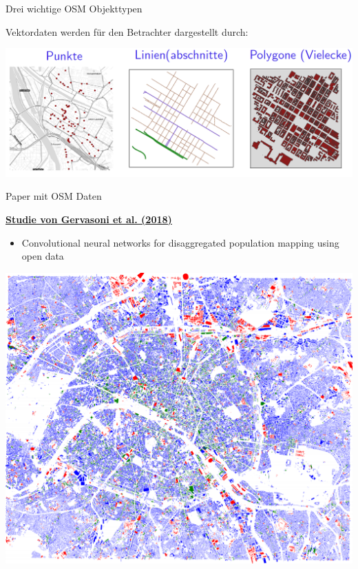 \documentclass[ignorenonframetext,]{beamer}
\providecommand{\tightlist}{%
  \setlength{\itemsep}{0pt}\setlength{\parskip}{0pt}}
\begin{document}
\begin{frame}{Drei wichtige OSM Objekttypen}

\begin{block}{Vektordaten werden für den Betrachter dargestellt durch:}

\includegraphics{figure/DreiObjektTypen.PNG}

\end{block}

\end{frame}

\begin{frame}{Paper mit OSM Daten}

\begin{block}{\href{https://hal.inria.fr/hal-01852585/document}{\textbf{Studie
von Gervasoni et al. (2018)}}}

\begin{itemize}
\tightlist
\item
  Convolutional neural networks for disaggregated population mapping
  using open data
\end{itemize}

\includegraphics{figure/Buldings_Paris.PNG}

\end{block}

\end{frame}
\end{document}

